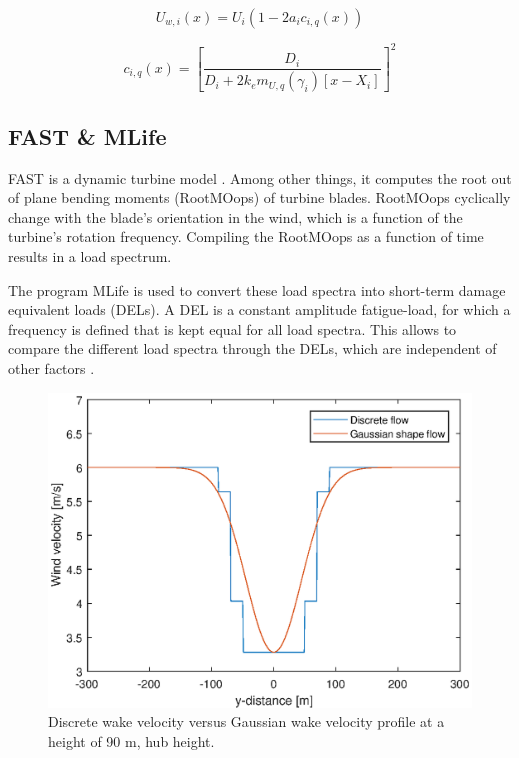 \begin{equation}
\label{eq:Uw}
U_{w,i}(x) = U_i\left( {1-2a_{i}c_{i,q}(x)} \right)
\end{equation} 

\begin{equation}
\label{eq:c}
c_{i,q}(x) = \left[ \frac{D_i}{D_i + 2k_em_{U,q}(\gamma_i)[x - X_i]} \right]^2
\end{equation}



\subsection{FAST \& MLife} \label{sec:fast} FAST is a dynamic turbine model \cite{Jonkman2005}. Among other things, it computes the root out of plane bending moments (RootMOops) of turbine blades. RootMOops cyclically change with the blade's orientation in the wind, which is a function of the turbine's rotation frequency. Compiling the RootMOops as a function of time results in a load spectrum.

The program MLife is used to convert these load spectra into short-term damage equivalent loads (DELs). A DEL is a constant amplitude fatigue-load, for which a frequency is defined that is kept equal for all load spectra. This allows to compare the different load spectra through the DELs, which are independent of other factors \cite{Wilson2017, MLife}. 


\begin{figure}
  \includegraphics[width=\linewidth]{./Figures/PlotGausDiscWakeDWake180U6yaw0.eps} %
  \caption{Discrete wake velocity versus Gaussian wake velocity profile at a height of 90 m, hub height.} %
  \label{fig:disgaus}
\end{figure}

